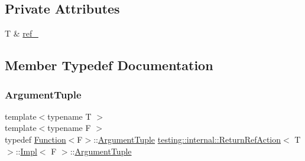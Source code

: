 \subsection*{Private Attributes}
\begin{DoxyCompactItemize}
\item 
T \& \mbox{\hyperlink{classtesting_1_1internal_1_1_return_ref_action_1_1_impl_adff308a917bb806ea09f56348ee42c5f}{ref\+\_\+}}
\end{DoxyCompactItemize}


\subsection{Member Typedef Documentation}
\mbox{\label{classtesting_1_1internal_1_1_return_ref_action_1_1_impl_a69311fc7b75aba0f2c444d6766c82a4a}} 
\subsubsection{\texorpdfstring{ArgumentTuple}{ArgumentTuple}\hspace{0.1cm}{\footnotesize\ttfamily [1/3]}}
{\footnotesize\ttfamily template$<$typename T $>$ \\
template$<$typename F $>$ \\
typedef \mbox{\hyperlink{structtesting_1_1internal_1_1_function}{Function}}$<$F$>$\+::\mbox{\hyperlink{classtesting_1_1_action_interface_af72720d864da4d606629e83edc003511}{Argument\+Tuple}} \mbox{\hyperlink{classtesting_1_1internal_1_1_return_ref_action}{testing\+::internal\+::\+Return\+Ref\+Action}}$<$ T $>$\+::\mbox{\hyperlink{classtesting_1_1internal_1_1_return_ref_action_1_1_impl}{Impl}}$<$ F $>$\+::\mbox{\hyperlink{classtesting_1_1_action_interface_af72720d864da4d606629e83edc003511}{Argument\+Tuple}}}

\mbox{\label{classtesting_1_1internal_1_1_return_ref_action_1_1_impl_a69311fc7b75aba0f2c444d6766c82a4a}} 
